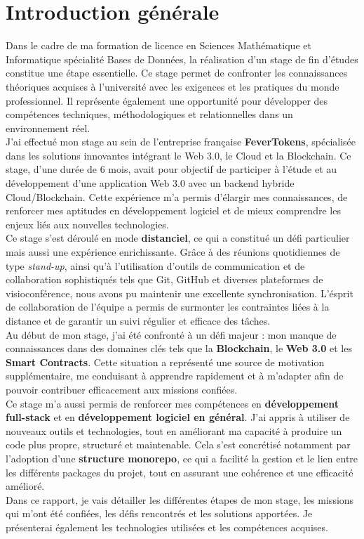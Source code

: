 \chapter*{Introduction générale}
Dans le cadre de ma formation de licence en Sciences Mathématique et Informatique spécialité Bases de Données, la réalisation d'un stage de fin d'études constitue une étape essentielle. Ce stage permet de confronter les connaissances théoriques acquises à l'université avec les exigences et les pratiques du monde professionnel. Il représente également une opportunité pour développer des compétences techniques, méthodologiques et relationnelles dans un environnement réel.\\[5mm]
J'ai effectué mon stage au sein de l'entreprise française \textbf{\textcolor{ftRed}{FeverTokens}}, spécialisée dans les solutions innovantes intégrant le Web 3.0, le Cloud et la Blockchain. Ce stage, d'une durée de 6 mois, avait pour objectif de participer à l'étude et au développement d'une application Web 3.0 avec un backend hybride Cloud/Blockchain. Cette expérience m'a permis d'élargir mes connaissances, de renforcer mes aptitudes en développement logiciel et de mieux comprendre les enjeux liés aux nouvelles technologies.
\\[5mm]
Ce stage s'est déroulé en mode \textbf{distanciel}, ce qui a constitué un défi particulier mais aussi une expérience enrichissante. Grâce à des réunions quotidiennes de type \textit{stand-up}, ainsi qu'à l'utilisation d'outils de communication et de collaboration sophistiqués tels que Git, GitHub et diverses plateformes de visioconférence, nous avons pu maintenir une excellente synchronisation. L'\' esprit de collaboration de l'équipe a permis de surmonter les contraintes liées à la distance et de garantir un suivi régulier et efficace des tâches.
\\[5mm]
Au début de mon stage,  j'ai été confronté à un défi majeur : mon manque de connaissances dans des domaines clés tels que la \textbf{Blockchain}, le \textbf{Web 3.0} et les \textbf{Smart Contracts}. Cette situation a représenté une source de motivation supplémentaire, me conduisant à apprendre rapidement et à m'adapter afin de pouvoir contribuer efficacement aux missions confiées.\\[5mm]
Ce stage m'a aussi permis de renforcer mes compétences en \textbf{développement full-stack} et en \textbf{développement logiciel en général}. J'ai appris à utiliser de nouveaux outils et technologies, tout en améliorant ma capacité à produire un code plus propre, structuré et maintenable. Cela s'est concrétisé notamment par l'adoption d'une \textbf{structure monorepo}, ce qui a facilité la gestion et le lien entre les différents packages du projet, tout en assurant une cohérence et une efficacité amélioré.\\[5mm]
Dans ce rapport, je vais détailler les différentes étapes de mon stage, les missions qui 
m'ont été confiées, les défis rencontrés et les solutions apportées. Je présenterai également les technologies utilisées et les compétences acquises.\\[5mm]